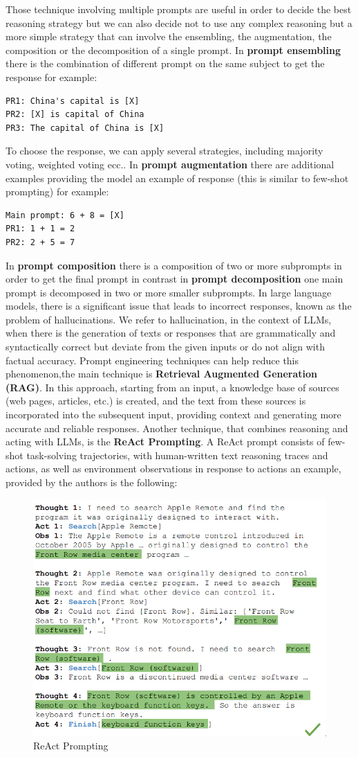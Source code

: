 Those technique involving multiple prompts are useful in order to decide the best reasoning strategy but we can also decide not to use any complex reasoning but a more simple strategy that can involve the ensembling, the augmentation, the composition or the decomposition of a single prompt.\cite{liu2023pre} In \textbf{prompt ensembling} there is the combination of different prompt on the same subject to get the response for example:
\begin{lstlisting}
PR1: China's capital is [X]
PR2: [X] is capital of China
PR3: The capital of China is [X]
\end{lstlisting}
To choose the response, we can apply several strategies, including majority voting, weighted voting ecc.. 
In \textbf{prompt augmentation} there are additional examples providing the model an example of response (this is similar to few-shot prompting) for example:
\begin{lstlisting}
Main prompt: 6 + 8 = [X]
PR1: 1 + 1 = 2
PR2: 2 + 5 = 7
\end{lstlisting}
In \textbf{prompt composition} there is a composition of two or more subprompts in order to get the final prompt in contrast in \textbf{prompt decomposition} one main prompt is decomposed in two or more smaller subprompts.
In large language models, there is a significant issue that leads to incorrect responses, known as the problem of hallucinations. We refer to hallucination, in the context of LLMs, when there is the generation of texts or responses that are grammatically and syntactically correct but deviate from the given inputs or do not align with factual accuracy. \cite{ye2023cognitive} Prompt engineering techniques can help reduce this phenomenon,the main technique is \textbf{Retrieval Augmented Generation (RAG)}. In this approach, starting from an input, a knowledge base of sources (web pages, articles, etc.) is created, and the text from these sources is incorporated into the subsequent input, providing context and generating more accurate and reliable responses. Another technique, that combines reasoning and acting with LLMs, is the \textbf{ReAct Prompting}. A ReAct prompt consists of few-shot task-solving trajectories, with human-written text reasoning traces and actions, as well as environment observations in response to actions \cite{react_llm} an example, provided by the authors is the following: 
\begin{figure}[H]
    \centering
    \includegraphics[width=0.7\linewidth]{Figures/fig_7.png}
    \caption{ReAct Prompting}
    \label{fig:enter-label}
\end{figure}
